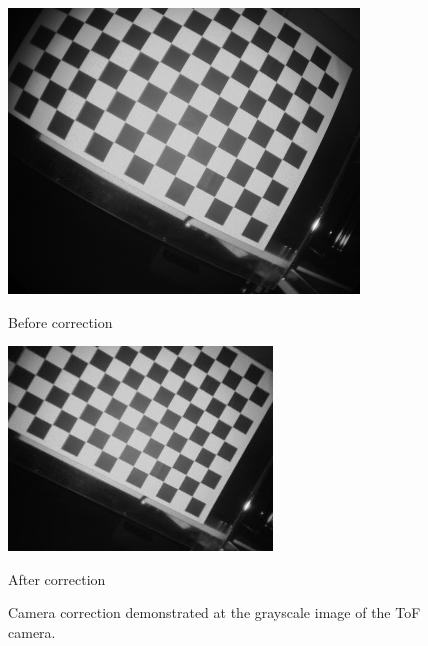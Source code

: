 \begin{figure}[H]
    \centering
    \begin{minipage}[b]{0.45\textwidth}
      \includegraphics[scale=0.70]{images/camcalib_source.jpg}
      \caption{Before correction}
      \label{fig:camCalibBefore} 
    \end{minipage} %
    \begin{minipage}[b]{0.45\textwidth}
      \includegraphics[scale=0.70]{images/camcalib_result.png} 
      \caption{After correction}
      \label{fig:camCalibAfter} 
    \end{minipage}
    \caption{Camera correction demonstrated at the grayscale image of the ToF camera.}
    \label{fig.camCalib}
  \end{figure}
